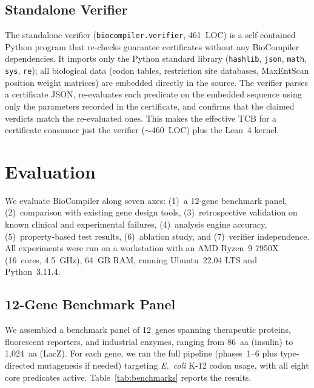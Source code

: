 \documentclass[acmsmall,review,anonymous]{acmart}
\begin{document}
\subsection{Standalone Verifier}

The standalone verifier (\texttt{biocompiler.verifier}, 461~LOC) is a
self-contained Python program that re-checks guarantee certificates
without any BioCompiler dependencies.  It imports only the Python
standard library (\texttt{hashlib}, \texttt{json}, \texttt{math},
\texttt{sys}, \texttt{re}); all biological data (codon tables,
restriction site databases, MaxEntScan position weight matrices) are
embedded directly in the source.  The verifier parses a certificate JSON,
re-evaluates each predicate on the embedded sequence using only the
parameters recorded in the certificate, and confirms that the claimed
verdicts match the re-evaluated ones.  This makes the effective TCB for a
certificate consumer just the verifier (${\sim}460$~LOC) plus the
Lean~4 kernel.


\section{Evaluation}\label{sec:eval}

We evaluate BioCompiler along seven axes: (1)~a 12-gene benchmark panel,
(2)~comparison with existing gene design tools, (3)~retrospective
validation on known clinical and experimental failures, (4)~analysis
engine accuracy, (5)~property-based test results, (6)~ablation study,
and (7)~verifier independence.  All experiments were run on a
workstation with an AMD Ryzen~9 7950X (16~cores, 4.5~GHz), 64~GB RAM,
running Ubuntu~22.04 LTS and Python~3.11.4.

\subsection{12-Gene Benchmark Panel}\label{sec:benchmark}

We assembled a benchmark panel of 12~genes spanning therapeutic proteins,
fluorescent reporters, and industrial enzymes, ranging from 86~aa
(insulin) to 1,024~aa (LacZ).  For each gene, we ran the full pipeline
(phases~1--6 plus type-directed mutagenesis if needed) targeting
\emph{E.~coli} K-12 codon usage, with all eight core predicates active.
Table~\ref{tab:benchmarks} reports the results.
\end{document}
